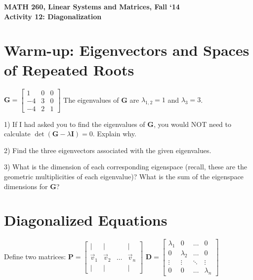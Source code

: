 \documentclass{article}
\begin{document}
\begin{flushleft}
	\bfseries{MATH 260, Linear Systems and Matrices, Fall `14}\\
	\bfseries{Activity 12:  Diagonalization}\\
\end{flushleft}
\begin{flushleft}

\section*{Warm-up:  Eigenvectors and Spaces of Repeated Roots}

$\textbf{G}
=\begin{bmatrix}
1 & 0 & 0\\
-4 & 3 & 0 \\
-4 & 2 & 1
\end{bmatrix}
$
\hspace{0.5in}
The eigenvalues of \textbf{G} are $\lambda_{1,2}=1$ and $\lambda_3 = 3$. 

\vspace{0.25in}
1) If I had asked you to find the eigenvalues of \textbf{G}, you would NOT need to calculate $\det(\textbf{G}-\lambda \textbf{I})=0$. Explain why.

\vspace{1in}

2) Find the three eigenvectors associated with the given eigenvalues.

\vspace{3in}

3) What is the dimension of each corresponding eigenspace (recall, these are the geometric multiplicities of each eigenvalue)? What is the sum of the eigenspace dimensions for \textbf{G}?

\vspace{1in}

\section*{Diagonalized Equations}
Define two matrices: $\textbf{P} = \begin{bmatrix}
| & | & & |\\
\vec{v}_1 & \vec{v}_2 & \ldots &\vec{v}_n \\
| & | & & |
\end{bmatrix} $
\hspace{0.5in}
$\textbf{D} = \begin{bmatrix}
\lambda_1 & 0 & \ldots & 0 \\
0 & \lambda_2 & \ldots & 0 \\
\vdots & \vdots & \ddots & \vdots \\
0 & 0 & \ldots & \lambda_n 
\end{bmatrix} $


\end{flushleft}
\end{document}
